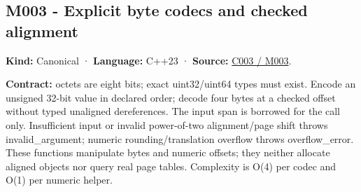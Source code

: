 \subsection{M003 - Explicit byte codecs and checked alignment}\label{appendix-4e2236f53445-m003---explicit-byte-codecs-and-checked-alignment}

\textbf{Kind:} Canonical · \textbf{Language:} C++23 · \textbf{Source:} \hyperref[01-foundations-i-ch002-where-the-bytes-live]{C003 / M003}.

\textbf{Contract:} octets are eight bits; exact uint32/uint64 types must exist. Encode an unsigned 32-bit value in declared order; decode four bytes at a checked offset without typed unaligned dereferences. The input span is borrowed for the call only. Insufficient input or invalid power-of-two alignment/page shift throws invalid\_argument; numeric rounding/translation overflow throws overflow\_error. These functions manipulate bytes and numeric offsets; they neither allocate aligned objects nor query real page tables. Complexity is O(4) per codec and O(1) per numeric helper.

